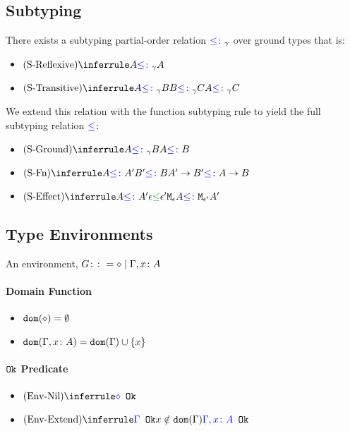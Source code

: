 \documentclass{report}
\begin{document}
\subsection{Subtyping}
    There exists a subtyping partial-order relation ${\color{blue} \leq\colon}_{\gamma}$ over ground types that is:
    \begin{itemize}
        \item $\ntreerulez{\sreflexive}{A \subtype_{\ground} A}$
        \item $\ntreeruleII{\stransitive}{A \subtype_{\ground} B }{ B \subtype_{\ground} C}{A \subtype_{\ground} C}$
    \end{itemize}

    We extend this relation with the function subtyping rule to yield the full subtyping relation ${\color{blue} \leq\colon}$

    \begin{itemize}
        \item $\ntreeruleI{\sground}{A \subtype_{\ground} B}{A \subtype B}$
        \item $\ntreeruleII{\sfun}{A \subtype A' }{ B' \subtype B }{\fntype{A'}{B'} \subtype \ab}$
        \item $\ntreeruleII{\seffect}{A\subtype A'}{\e\subeffect\e'}{\mea\subtype\M{\e'}{A'}}$
    \end{itemize}
\subsection{Type Environments}
An environment, $G \colon\colon= \diamond \mid \Gamma, x\colon A$ 
\paragraph{Domain Function}
\begin{itemize}
    \item $\texttt{dom}(\diamond) = \emptyset$
    \item $\texttt{dom}(\Gamma, x\colon A) =  \texttt{dom}(\Gamma)  \cup \left\{x \right\}$
\end{itemize}
\paragraph{$\texttt{Ok}$ Predicate}
\begin{itemize}
    \item $\ntreerulez{\envnil}{\ok{\nil}}$
    \item $\ntreeruleII{\envextend}{\ok{\G} }{ x\notin \dom{\G}}{\ok{\gax}}$
\end{itemize}
\end{document}
